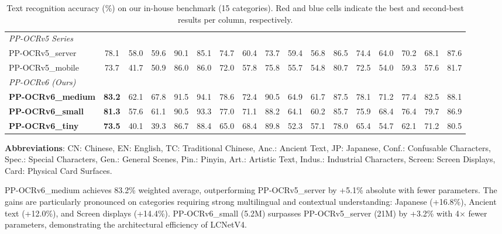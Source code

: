 \documentclass[11pt, a4paper,logo,  copyright, nonumbering]{paddleocr}
\begin{document}
\begin{table}[!htbp]
{\begin{tabular}{@{}l c *{15}{c} @{}}
\midrule
\multicolumn{17}{l}{\textit{PP-OCRv5 Series}} \\
\quad PP-OCRv5\_server & 78.1 & 58.0 & 59.6 & 90.1 & 85.1 & 74.7 & 60.4 & 73.7 & 59.4 & 56.8 & \cellcolor{cyan!10}86.5 & 74.4 & 64.0 & 70.2 & 68.1 & \cellcolor{cyan!10}87.6 \\
\quad PP-OCRv5\_mobile & 73.7 & 41.7 & 50.9 & 86.0 & 86.0 & 72.0 & 57.8 & 75.8 & 55.7 & 54.8 & 80.7 & 72.5 & 54.0 & 59.3 & 57.6 & 81.7 \\
\midrule
\multicolumn{17}{l}{\textit{PP-OCRv6 (Ours)}} \\
\quad \textbf{PP-OCRv6\_medium} & \cellcolor{red!10}\textbf{83.2} & \cellcolor{red!10}62.1 & 67.8 & \cellcolor{red!10}91.5 & \cellcolor{red!10}94.1 & \cellcolor{red!10}78.6 & \cellcolor{red!10}72.4 & \cellcolor{red!10}90.5 & \cellcolor{red!10}64.9 & \cellcolor{red!10}61.7 & \cellcolor{red!10}87.5 & \cellcolor{red!10}78.1 & \cellcolor{red!10}71.2 & \cellcolor{red!10}77.4 & \cellcolor{red!10}82.5 & \cellcolor{red!10}88.1 \\
\quad \textbf{PP-OCRv6\_small} & \cellcolor{cyan!10}\textbf{81.3} & \cellcolor{cyan!10}57.6 & 61.1 & \cellcolor{cyan!10}90.5 & 93.3 & \cellcolor{cyan!10}77.0 & \cellcolor{cyan!10}71.1 & 88.2 & \cellcolor{cyan!10}64.1 & \cellcolor{cyan!10}60.2 & 85.7 & 75.9 & 68.4 & \cellcolor{cyan!10}76.4 & \cellcolor{cyan!10}79.7 & 86.9 \\
\quad \textbf{PP-OCRv6\_tiny} & \textbf{73.5} & 40.1 & 39.3 & 86.7 & 88.4 & 65.0 & 68.4 & \cellcolor{cyan!10}89.8 & 52.3 & 57.1 & 78.0 & 65.4 & 54.7 & 62.1 & 71.2 & 80.5 \\
\bottomrule
\end{tabular}
}
\caption{Text recognition accuracy (\%) on our in-house benchmark (15 categories). \colorbox{red!10}{Red} and \colorbox{cyan!10}{blue} cells indicate the best and second-best results per column, respectively.}
\label{tab:rec_main}

\vspace{4pt}
\footnotesize
\textbf{Abbreviations}: CN: Chinese, EN: English, TC: Traditional Chinese, Anc.: Ancient Text, JP: Japanese, Conf.: Confusable Characters, Spec.: Special Characters, Gen.: General Scenes, Pin.: Pinyin, Art.: Artistic Text, Indus.: Industrial Characters, Screen: Screen Displays, Card: Physical Card Surfaces.
\end{table}



PP-OCRv6\_medium achieves 83.2\% weighted average, outperforming PP-OCRv5\_server by +5.1\% absolute with fewer parameters. The gains are particularly pronounced on categories requiring strong multilingual and contextual understanding: Japanese (+16.8\%), Ancient text (+12.0\%), and Screen displays (+14.4\%). PP-OCRv6\_small (5.2M) surpasses PP-OCRv5\_server (21M) by +3.2\% with 4$\times$ fewer parameters, demonstrating the architectural efficiency of LCNetV4.
\end{document}
